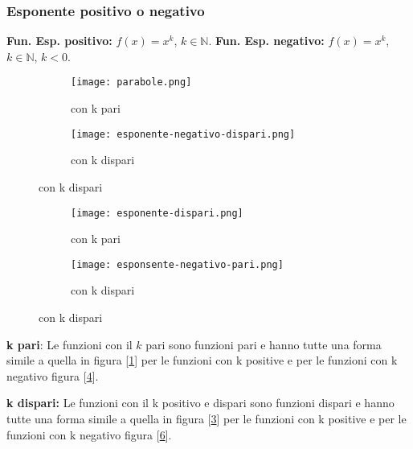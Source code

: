 \subsubsection{Esponente positivo o negativo}
\textbf{Fun. Esp. positivo:} $f(x) = x^k$, $k \in \mathbb{N}$. \hfill \textbf{Fun. Esp. negativo:} $f(x) = x^k$, $k \in \mathbb{N}$, $k < 0$.
\begin{figure}[h!]
    \begin{subfigure}{.5\textwidth}
        \centering
        \texttt{[image: parabole.png]}
        \caption{con k pari}
        \label{fig:esponente-positivo-pari}
    \end{subfigure}
    \begin{subfigure}{.5\textwidth}
        \centering
        \texttt{[image: esponente-negativo-dispari.png]}
        \caption{con k dispari}
        \label{fig:esponente-positivo-dispari}
    \end{subfigure}
\end{figure}
\begin{figure}[h!]
    \vspace{-5pt}
    \begin{subfigure}{.5\textwidth}
        \centering
        \texttt{[image: esponente-dispari.png]}
        \caption{con k pari}
        \label{fig:esponente-negativo-pari}
    \end{subfigure}
    \begin{subfigure}{.5\textwidth}
        \centering
        \texttt{[image: esponsente-negativo-pari.png]}
        \caption{con k dispari}
        \label{fig:esponente-negativo-dispari}
    \end{subfigure}
\end{figure}
\begin{observation}
    \textbf{k pari}: Le funzioni con il $k$ pari sono funzioni pari e hanno tutte una forma simile a quella in figura [\ref{fig:esponente-positivo-pari}] per le funzioni con k positive e per le funzioni con k negativo figura [\ref{fig:esponente-negativo-pari}].
\end{observation}
\begin{observation}
    \textbf{k dispari:} Le funzioni con il k positivo e dispari sono funzioni dispari e hanno tutte una forma simile a quella in figura [\ref{fig:esponente-positivo-dispari}] per le funzioni con k positive e per le funzioni con k negativo figura [\ref{fig:esponente-negativo-dispari}].
\end{observation}

